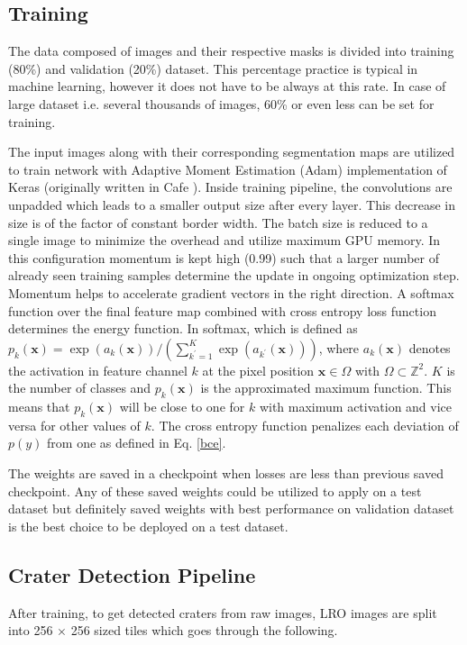 \documentclass[11pt]{article}
\begin{document}
\subsection{Training}
The data composed of images and their respective masks is divided into training (80\%) and validation (20\%) dataset. This percentage practice is typical in machine learning, however it does not have to be always at this rate. In case of large dataset i.e. several thousands of images, 60\% or even less can be set for training.

The input images along with their corresponding segmentation maps are utilized to train network with Adaptive Moment Estimation (Adam) implementation of Keras (originally written in Cafe \cite{ronneberger2015u}). Inside training pipeline, the convolutions are unpadded which leads to a smaller output size after every layer. This decrease in size is of the factor of constant border width. The batch size is reduced to a single image to minimize the overhead and utilize maximum GPU memory. In this configuration momentum is kept high (0.99) such that a larger number of already seen training samples determine the update in ongoing optimization step. Momentum helps to accelerate gradient vectors in the right direction. A softmax function over the final feature map combined with cross entropy loss function determines the energy function. In softmax, which is defined as $p_{k}(\mathbf{x})=\exp \left(a_{k}(\mathbf{x})\right) /\left(\sum_{k^{\prime}=1}^{K} \exp \left(a_{k^{\prime}}(\mathbf{x})\right)\right)$, where $a_{k}(\mathbf{x})$ denotes the activation in feature channel $k$ at the pixel position $\mathbf{x} \in \Omega$ with $\Omega \subset \mathbb{Z}^{2}$. $K$ is the number of classes and $p_{k}(\mathbf{x})$ is the approximated maximum function. This means that $p_{k}(\mathbf{x})$ will be close to one for $k$ with maximum activation and vice versa for other values of $k$. The cross entropy function penalizes each deviation of $p(y)$ from one as defined in Eq. \ref{bce}.

The weights are saved in a checkpoint when losses are less than previous saved checkpoint. Any of these saved weights could be utilized to apply on a test dataset but definitely saved weights with best performance on validation dataset is the best choice to be deployed on a test dataset.

\subsection{Crater Detection Pipeline}
After training, to get detected craters from raw images, LRO images are split into 256 $\times$ 256 sized tiles which goes through the following.
\end{document}

